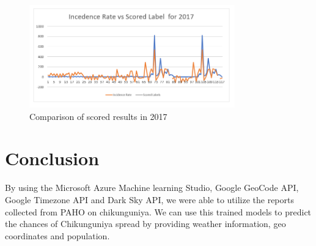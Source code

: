 \documentclass[conference]{IEEEtran}
\begin{document}
\begin{figure}[ht!] %
 \centering
 \includegraphics[width=3.5in]{8.png}
 \caption{Comparison of scored results in 2017}
 \label{compare_score_2017}
 \end{figure}


\clearpage
\thispagestyle{empty}
\section{Conclusion}

By using the Microsoft Azure Machine learning Studio, Google GeoCode API, Google Timezone API and Dark Sky API, we were able to utilize the reports collected from PAHO on chikunguniya. We can use this trained models to predict the chances of Chikunguniya spread by providing weather information, geo coordinates and population.
\end{document}
